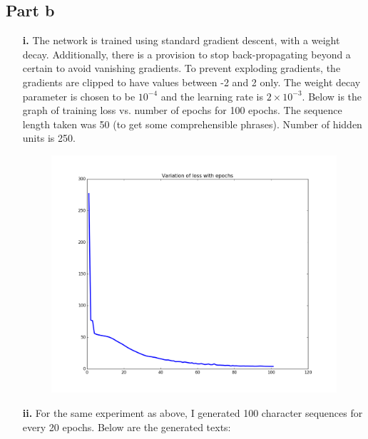 \documentclass{article}
\begin{document}
\subsection*{Part b}
\begin{flushleft}
\begin{itemize}
\item [\textbf{i.}] The network is trained using standard gradient descent, with a weight decay. Additionally, there is a provision to stop back-propagating beyond a certain to avoid vanishing gradients. To prevent exploding gradients, the gradients are clipped to have values between -2 and 2 only. The weight decay parameter is chosen to be \(10^{-4}\) and the learning rate is \(2\times 10^{-3}\). Below is the graph of training loss vs. number of epochs for 100 epochs. The sequence length taken was 50 (to get some comprehensible phrases). Number of hidden units is 250.

\begin{figure}[H]
\centering
\includegraphics[width=0.75\linewidth]{RNN_training.png}
\end{figure}
\newpage
\item [\textbf{ii.}] For the same experiment as above, I generated 100 character sequences for every 20 epochs. Below are the generated texts:\\
\end{itemize}
\end{flushleft}
\end{document}

